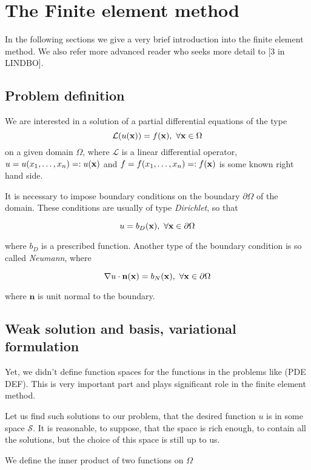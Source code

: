 \chapter{The Finite element method}

\par In the following sections we give a very brief introduction into the finite element method. 
We also refer more advanced reader who seeks more detail to [3 in LINDBO].

\section{Problem definition}

\par We are interested in a solution of a partial differential equations of the type 
$$\mathcal{L}(u(\mathbf{x})) = f(\mathbf{x}),~\forall \mathbf{x}\in\Omega$$
on a given domain $\Omega$, where $\mathcal{L}$ is a linear differential operator, 
$u = u(x_1,\ldots,x_n)=: u(\mathbf{x})$
and
$f = f(x_1,\ldots,x_n) =: f(\mathbf{x})$
is some known right hand side.

\par It is necessary to impose boundary conditions on the boundary $\partial\Omega$ of the domain. These conditions are usually of type \textit{Dirichlet}, so that

$$ u = b_D(\mathbf{x}),~\forall \mathbf{x} \in \partial\Omega $$

where $b_D$ is a prescribed function. Another type of the boundary condition is so called \textit{Neumann}, where

$$ \nabla u \cdot \mathbf{n}(\mathbf{x}) = b_N(\mathbf{x}),~\forall \mathbf{x}\in\partial\Omega $$

where $\mathbf{n}$ is unit normal to the boundary.

\section{Weak solution and basis, variational formulation}

\par Yet, we didn't define function spaces for the functions in the problems like (PDE DEF). 
This is very important part and plays significant role in the finite element method.
\par Let us find such solutions to our problem, that the desired function $u$ is in some space $\mathcal{S}$.
It is reasonable, to suppose, that the space is rich enough, to contain all the solutions, but the choice of this space is still up to us. 
\par We define the inner product of two functions on $\Omega$ 

